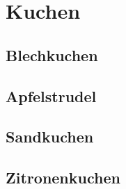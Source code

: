 \section{Kuchen}\label{sec:kuchen}

\subsection{Blechkuchen}\label{subsec:blechkuchen}

\subsection{Apfelstrudel}\label{subsec:apfelstrudel}

\subsection{Sandkuchen}\label{subsec:sandkuchen}

\subsection{Zitronenkuchen}\label{subsec:zitronenkuchen}
